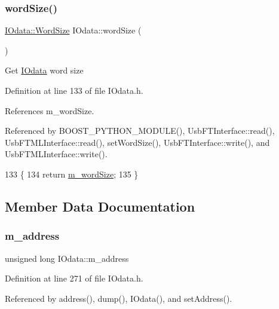 \subsubsection{\texorpdfstring{word\+Size()}{wordSize()}}
{\footnotesize\ttfamily \hyperlink{classIOdata_a37c53ebf4bf8d866aac8af572962a84c}{I\+Odata\+::\+Word\+Size} I\+Odata\+::word\+Size (\begin{DoxyParamCaption}{ }\end{DoxyParamCaption})\hspace{0.3cm}{\ttfamily [inline]}}

Get \hyperlink{classIOdata}{I\+Odata} word size 

Definition at line 133 of file I\+Odata.\+h.



References m\+\_\+word\+Size.



Referenced by B\+O\+O\+S\+T\+\_\+\+P\+Y\+T\+H\+O\+N\+\_\+\+M\+O\+D\+U\+L\+E(), Usb\+F\+T\+Interface\+::read(), Usb\+F\+T\+M\+L\+Interface\+::read(), set\+Word\+Size(), Usb\+F\+T\+Interface\+::write(), and Usb\+F\+T\+M\+L\+Interface\+::write().


\begin{DoxyCode}
133                            \{
134     \textcolor{keywordflow}{return} \hyperlink{classIOdata_a719b0ce607ada4fa91b12d6ecfa1b4c9}{m\_wordSize};
135   \}
\end{DoxyCode}


\subsection{Member Data Documentation}
\mbox{\label{classIOdata_a965810e1888b904c575277f50cea734a}} 
\subsubsection{\texorpdfstring{m\+\_\+address}{m\_address}}
{\footnotesize\ttfamily unsigned long I\+Odata\+::m\+\_\+address\hspace{0.3cm}{\ttfamily [private]}}



Definition at line 271 of file I\+Odata.\+h.



Referenced by address(), dump(), I\+Odata(), and set\+Address().

